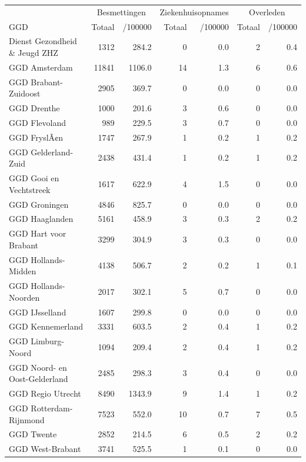 \documentclass[
  english,
  man,floatsintext]{apa6}
\begin{document}
\begin{table}
\centering\begingroup\fontsize{10}{12}\selectfont

\begin{threeparttable}
\begin{tabular}{lrrrrrr}
\toprule
\multicolumn{1}{c}{ } & \multicolumn{2}{c}{Besmettingen} & \multicolumn{2}{c}{Ziekenhuisopnames} & \multicolumn{2}{c}{Overleden} \\
\cmidrule(l{3pt}r{3pt}){2-3} \cmidrule(l{3pt}r{3pt}){4-5} \cmidrule(l{3pt}r{3pt}){6-7}
GGD & Totaal & /100000 & Totaal & /100000 & Totaal & /100000\\
\midrule
Dienst Gezondheid \& Jeugd ZHZ & 1312 & 284.2 & 0 & 0.0 & 2 & 0.4\\
GGD Amsterdam & 11841 & 1106.0 & 14 & 1.3 & 6 & 0.6\\
GGD Brabant-Zuidoost & 2905 & 369.7 & 0 & 0.0 & 0 & 0.0\\
GGD Drenthe & 1000 & 201.6 & 3 & 0.6 & 0 & 0.0\\
GGD Flevoland & 989 & 229.5 & 3 & 0.7 & 0 & 0.0\\
GGD FryslÃ¢n & 1747 & 267.9 & 1 & 0.2 & 1 & 0.2\\
GGD Gelderland-Zuid & 2438 & 431.4 & 1 & 0.2 & 1 & 0.2\\
GGD Gooi en Vechtstreek & 1617 & 622.9 & 4 & 1.5 & 0 & 0.0\\
GGD Groningen & 4846 & 825.7 & 0 & 0.0 & 0 & 0.0\\
GGD Haaglanden & 5161 & 458.9 & 3 & 0.3 & 2 & 0.2\\
GGD Hart voor Brabant & 3299 & 304.9 & 3 & 0.3 & 0 & 0.0\\
GGD Hollands-Midden & 4138 & 506.7 & 2 & 0.2 & 1 & 0.1\\
GGD Hollands-Noorden & 2017 & 302.1 & 5 & 0.7 & 0 & 0.0\\
GGD IJsselland & 1607 & 299.8 & 0 & 0.0 & 0 & 0.0\\
GGD Kennemerland & 3331 & 603.5 & 2 & 0.4 & 1 & 0.2\\
GGD Limburg-Noord & 1094 & 209.4 & 2 & 0.4 & 1 & 0.2\\
GGD Noord- en Oost-Gelderland & 2485 & 298.3 & 3 & 0.4 & 0 & 0.0\\
GGD Regio Utrecht & 8490 & 1343.9 & 9 & 1.4 & 1 & 0.2\\
GGD Rotterdam-Rijnmond & 7523 & 552.0 & 10 & 0.7 & 7 & 0.5\\
GGD Twente & 2852 & 214.5 & 6 & 0.5 & 2 & 0.2\\
GGD West-Brabant & 3741 & 525.5 & 1 & 0.1 & 0 & 0.0\\

\end{tabular}
\end{threeparttable}
\end{table}
\end{document}
